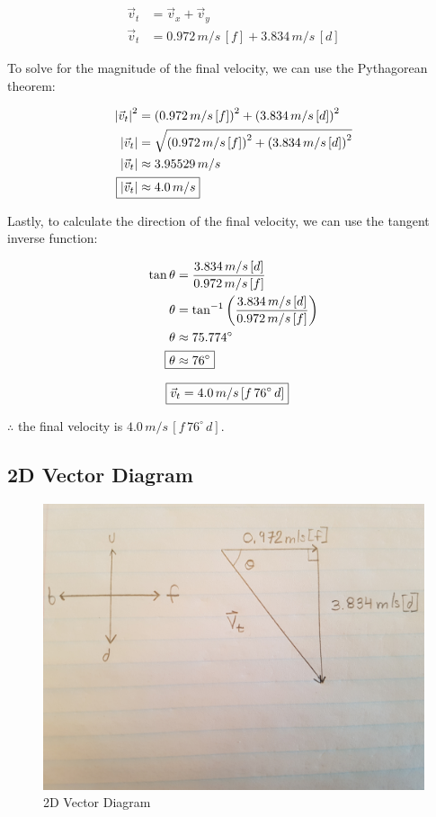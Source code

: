 \documentclass[12pt]{article}
\numberwithin{equation}{section}
\begin{document}
\begin{align}
\vec{v}_t&=\vec{v}_x+\vec{v}_y\\
\vec{v}_t&=0.972\,m/s\,[f]+3.834\,m/s\,[d]
\end{align}

To solve for the magnitude of the final velocity, we can use the Pythagorean theorem:

\begin{align}
{|\vec{v}_t|}^2&={(0.972\,m/s\,[f])}^2+{(3.834\,m/s\,[d])}^2\\
|\vec{v}_t|&=\sqrt{{(0.972\,m/s\,[f])}^2+{(3.834\,m/s\,[d])}^2}\\
|\vec{v}_t|&\approx3.95529\,m/s\\
\Aboxed{|\vec{v}_t|&\approx4.0\,m/s}
\end{align}

Lastly, to calculate the direction of the final velocity, we can use the tangent inverse function:

\begin{align}
\tan\theta&=\frac{3.834\,m/s\,[d]}{0.972\,m/s\,[f]}\\
\theta&=\tan^{-1}\left(\frac{3.834\,m/s\,[d]}{0.972\,m/s\,[f]}\right)\\
\theta&\approx{75.774}^{\circ}\\
\Aboxed{\theta&\approx{76}^{\circ}}
\end{align}

\begin{align}
\Aboxed{\vec{v}_t&=4.0\,m/s\,[f\,76^{\circ}\,d]}
\end{align}

$\therefore$ the final velocity is $4.0\,m/s\,[f\,76^{\circ}\,d]$.

\subsection{2D Vector Diagram}

\begin{figure}[H]
	\centering
	\includegraphics[scale=0.11]{data-collection/2d-vector-diagram.jpg}
	\caption{2D Vector Diagram}
	\label{fig:diagram}
\end{figure}
\end{document}
